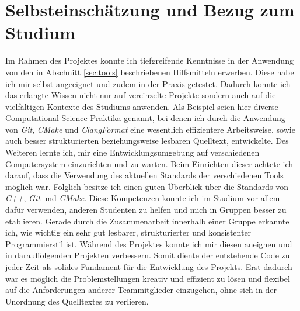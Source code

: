 \documentclass[crop=false]{standalone}
\begin{document}
  \section{Selbsteinschätzung und Bezug zum Studium} %
  \label{sec:selbsteinschaetzung}
    Im Rahmen des Projektes konnte ich tiefgreifende Kenntnisse in der Anwendung von den in Abschnitt \ref{sec:tools} beschriebenen Hilfsmitteln erwerben.
    Diese habe ich mir selbst angeeignet und zudem in der Praxis getestet.
    Dadurch konnte ich das erlangte Wissen nicht nur auf vereinzelte Projekte sondern auch auf die vielfältigen Kontexte des Studiums anwenden.
    Als Beispiel seien hier diverse Computational Science Praktika genannt, bei denen ich durch die Anwendung von \textit{Git}, \textit{CMake} und \textit{ClangFormat} eine wesentlich effizientere Arbeitsweise, sowie auch besser strukturierten beziehungsweise lesbaren Quelltext, entwickelte.
    Des Weiteren lernte ich, mir eine Entwicklungsumgebung auf verschiedenen Computersystem einzurichten und zu warten.
    Beim Einrichten dieser achtete ich darauf, dass die Verwendung des aktuellen Standards der verschiedenen Tools möglich war.
    Folglich besitze ich einen guten Überblick über die Standards von \textit{C++}, \textit{Git} und \textit{CMake}.
    Diese Kompetenzen konnte ich im Studium vor allem dafür verwenden, anderen Studenten zu helfen und mich in Gruppen besser zu etablieren.
    Gerade durch die Zusammenarbeit innerhalb einer Gruppe erkannte ich, wie wichtig ein sehr gut lesbarer, strukturierter und konsistenter Programmierstil ist.
    Während des Projektes konnte ich mir diesen aneignen und in darauffolgenden Projekten verbessern.
    Somit diente der entstehende Code zu jeder Zeit als solides Fundament für die Entwicklung des Projekts.
    Erst dadurch war es möglich die Problemstellungen kreativ und effizient zu lösen und flexibel auf die Anforderungen anderer Teammitglieder einzugehen, ohne sich in der Unordnung des Quelltextes zu verlieren.
\end{document}
